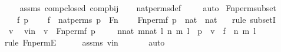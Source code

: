 \begin{isabellebody}
\isadelimproof
\ \ %
\endisadelimproof
%
\isatagproof
{}\isamarkupfalse%
\ assms\ comp{\isacharunderscore}{\kern0pt}closed\ comp{\isacharunderscore}{\kern0pt}bij\isanewline
\ \ \isamarkupfalse%
\ nat{\isacharunderscore}{\kern0pt}perms{\isacharunderscore}{\kern0pt}def\ \isanewline
\ \ \isamarkupfalse%
\ auto%
\endisatagproof
{\isafoldproof}%
%
\isadelimproof
\isanewline
%
\endisadelimproof
\isanewline
{}\isamarkupfalse%
\ Fn{\isacharunderscore}{\kern0pt}perm{\isacharunderscore}{\kern0pt}subset\ {\isacharcolon}{\kern0pt}\ \isanewline
\ \ \ f\ p\ \isanewline
\ \ \ {\isachardoublequoteopen}f\ {\isasymin}\ nat{\isacharunderscore}{\kern0pt}perms{\isachardoublequoteclose}\ {\isachardoublequoteopen}p\ {\isasymin}\ Fn{\isachardoublequoteclose}\ \isanewline
\ \ \ {\isachardoublequoteopen}Fn{\isacharunderscore}{\kern0pt}perm{\isacharparenleft}{\kern0pt}f{\isacharcomma}{\kern0pt}\ p{\isacharparenright}{\kern0pt}\ {\isasymsubseteq}\ {\isacharparenleft}{\kern0pt}nat\ {\isasymtimes}\ nat{\isacharparenright}{\kern0pt}\ {\isasymtimes}\ {}{\isachardoublequoteclose}\ \isanewline
%
\isadelimproof
%
\endisadelimproof
%
\isatagproof
{}\isamarkupfalse%
{\isacharparenleft}{\kern0pt}rule\ subsetI{\isacharparenright}{\kern0pt}\isanewline
\ \ \isamarkupfalse%
\ v\ \isamarkupfalse%
\ vin\ {\isacharcolon}{\kern0pt}\ {\isachardoublequoteopen}v\ {\isasymin}\ Fn{\isacharunderscore}{\kern0pt}perm{\isacharparenleft}{\kern0pt}f{\isacharcomma}{\kern0pt}\ p{\isacharparenright}{\kern0pt}{\isachardoublequoteclose}\ \isanewline
\ \ \isamarkupfalse%
\ {\isachardoublequoteopen}{\isasymexists}n{\isasymin}nat{\isachardot}{\kern0pt}\ {\isasymexists}m{\isasymin}nat{\isachardot}{\kern0pt}\ {\isasymexists}l{\isasymin}{}{\isachardot}{\kern0pt}\ {\isasymlangle}{\isasymlangle}n{\isacharcomma}{\kern0pt}\ m{\isasymrangle}{\isacharcomma}{\kern0pt}\ l{\isasymrangle}\ {\isasymin}\ p\ {\isasymand}\ v\ {\isacharequal}{\kern0pt}\ {\isasymlangle}{\isasymlangle}f\ {\isacharbackquote}{\kern0pt}\ n{\isacharcomma}{\kern0pt}\ m{\isasymrangle}{\isacharcomma}{\kern0pt}\ l{\isasymrangle}{\isachardoublequoteclose}\isanewline
\ \ \ \ \isamarkupfalse%
{\isacharparenleft}{\kern0pt}rule\ Fn{\isacharunderscore}{\kern0pt}permE{\isacharparenright}{\kern0pt}\isanewline
\ \ \ \ \isamarkupfalse%
\ assms\ vin\ \isanewline
\ \ \ \ \isamarkupfalse%
\ auto\isanewline
\ \ \isamarkupfalse%

\end{isabellebody}
